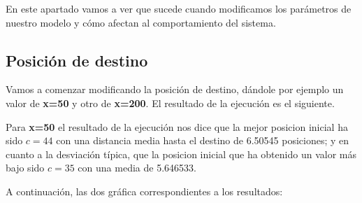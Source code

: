 \documentclass[11pt,a4paper]{report}
\begin{document}
En este apartado vamos a ver que sucede cuando modificamos los parámetros de nuestro modelo y cómo afectan al comportamiento
del sistema. 

\subsection{Posición de destino}

Vamos a comenzar modificando la posición de destino, dándole por ejemplo un valor de \textbf{x=50} y otro de \textbf{x=200}.
El resultado de la ejecución es el siguiente.

\newpage

Para \textbf{x=50} el resultado de la ejecución nos dice que la mejor posicion inicial ha sido $c=44$ con una distancia media hasta
el destino de 6.50545 posiciones; y en cuanto a la desviación típica, que la posicion inicial que ha obtenido un valor más
bajo sido $c=35$ con una media de 5.646533.

A continuación, las dos gráfica correspondientes a los resultados:
\end{document}
